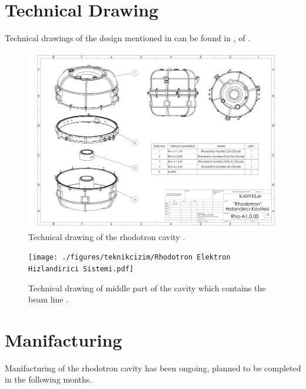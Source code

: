\documentclass[a4paper,oneside,12pt]{report}
\numberwithin{equation}{chapter}
\begin{document}
{%
\section{Technical Drawing}
Technical drawings of the design mentioned in  can be found in ,  of .

\vspace{-20pt}
\begin{figure}[H]
    \centering
    \includegraphics[angle=90,origin=c, width=.95\linewidth]{./figures/teknikcizim/Rho-A1.0.00.pdf}
    \vspace{5pt}
    \caption{Technical drawing of the rhodotron cavity \cite{sinan}.}
    \label{fig:techd_rhod}
\end{figure}
\clearpage
\begin{figure}[!th]
    \centering
    \texttt{[image: ./figures/teknikcizim/Rhodotron Elektron Hizlandirici Sistemi.pdf]}
    \vspace{10pt}
    \caption{Technical drawing of middle part of the cavity which contains the beam line \cite{sinan}.}
    \label{fig:techd_mid}
\end{figure}


\section{Manifacturing}

Manifacturing of the rhodotron cavity has been ongoing, planned to be completed in the following months.

}
\end{document}
